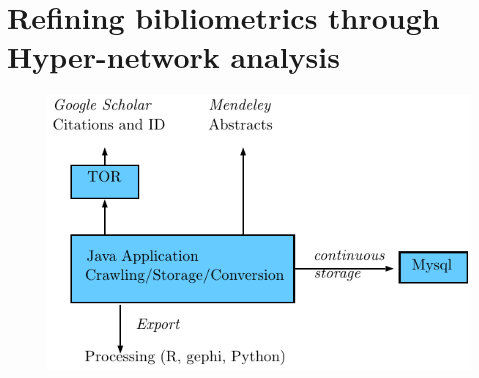 
\newpage



\section{Refining bibliometrics through Hyper-network analysis}



\cite{10.1371/journal.pone.0147913,2015arXiv150601280B,2016arXiv160106075O,bohannon2014scientific,noruzi2005google,schmid1994probabilistic}



\begin{figure}
\includegraphics[width=\textwidth]{Figures/PartI/QuantitativeEpistemo/HyperNetwork/archi}
\end{figure}


